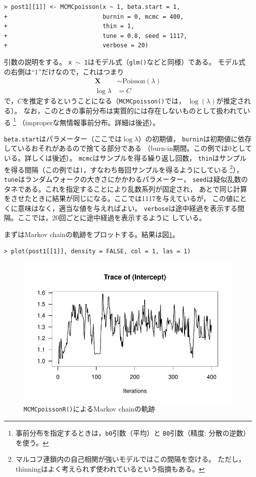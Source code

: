 \documentclass[11pt,uplatex]{jsarticle}
\begin{document}
\begin{lstlisting}
> post1[[1]] <- MCMCpoisson(x ~ 1, beta.start = 1,
+                           burnin = 0, mcmc = 400,
+                           thin = 1,
+                           tune = 0.8, seed = 1117,
+                           verbose = 20)
\end{lstlisting}
引数の説明をする。
\texttt{x $\sim$ 1}はモデル式（\texttt{glm()}などと同様）である。
モデル式の右側は``1''だけなので，これはつまり
\begin{align*}
\bm{X} &\sim \mathrm{Poisson}(\lambda)
\\
\log\lambda &= C
\end{align*}
で，$C$を推定するということになる（\texttt{MCMCpoisson()}では，
$\log(\lambda)$が推定される）。
なお，このときの事前分布は実質的には存在しないものとして扱われている
\footnote{事前分布を指定するときは，\texttt{b0}引数（平均）と
\texttt{B0}引数（精度: 分散の逆数）を使う。}
（improperな無情報事前分布。詳細は後述）。

\texttt{beta.start}はパラメーター（ここでは$\log\lambda$）の初期値，
\texttt{burnin}は初期値に依存しているおそれがあるので捨てる部分である
（burn-in期間。この例では0としている。詳しくは後述）。
\texttt{mcmc}はサンプルを得る繰り返し回数，
\texttt{thin}はサンプルを得る間隔（この例では1，すなわち毎回サンプルを得るようにしている
\footnote{マルコフ連鎖内の自己相関が強いモデルではこの間隔を空ける。
ただし，thinningはよく考えられず使われているという指摘もある\cite{Link2012}。}），
\texttt{tune}はランダムウォークの大きさにかかわるパラメーター，
\texttt{seed}は疑似乱数のタネである。これを指定することにより乱数系列が固定され，
あとで同じ計算をさせたときに結果が同じになる。ここでは1117を与えているが，
この値にとくに意味はなく，適当な値を与えればよい。
\texttt{verbose}は途中経過を表示する間隔。ここでは，20回ごとに途中経過を表示するように
している。

まずはMarkov chainの軌跡をプロットする。結果は図\ref{MCMCpoisson_plot}。

\begin{lstlisting}
> plot(post1[[1]], density = FALSE, col = 1, las = 1)
\end{lstlisting}
%
\begin{figure}[hbtp]
  \begin{center}
    \includegraphics[bb=0 0 360 240, clip, width=240 bp]{example1-1.pdf}
  \end{center}
  \caption{\texttt{MCMCpoissonR()}によるMarkov chainの軌跡}
  \label{MCMCpoisson_plot}
\end{figure}
\end{document}
